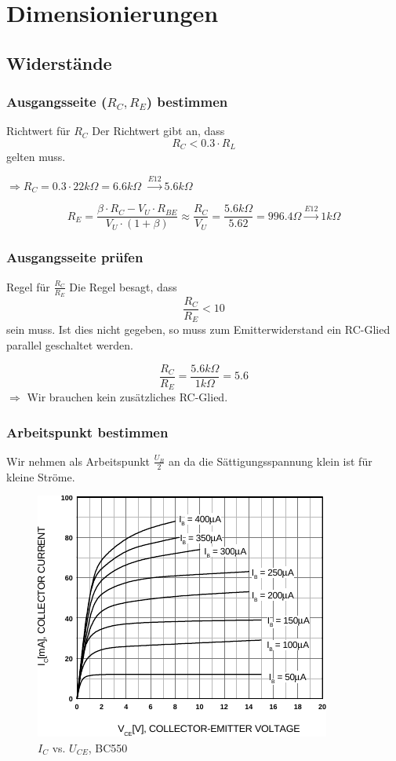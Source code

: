 \section{Dimensionierungen}

\subsection{Widerstände}

\begin{frame}
	\frametitle{Ausgangsseite ($R_C, R_E$) bestimmen}
		\begin{block}{Richtwert für $R_C$}
			Der Richtwert gibt an, dass
			\[R_C < 0.3 \cdot R_L \]
			gelten muss.
		\end{block}
			$\Rightarrow R_C = 0.3 \cdot 22k \Omega = 6.6k \Omega$
			$\xrightarrow{E12} 5.6k \Omega$

		\[ R_E = \frac{\beta \cdot R_C - V_U \cdot R_{BE}}
		{V_U \cdot (1+\beta)} \approx \frac{R_C}{V_U} =
		\frac{5.6k \Omega}{5.62} = 
		996.4 \Omega \xrightarrow{E12} 1k \Omega \]
\end{frame}

\begin{frame}
	\frametitle{Ausgangsseite prüfen}
		\begin{block}{Regel für $\frac{R_C}{R_E}$}
			Die Regel besagt, dass 
			\[ \frac{R_C}{R_E} < 10 \]
			sein muss. Ist dies nicht gegeben, so muss zum
			Emitterwiderstand ein RC-Glied parallel geschaltet
			werden.	
		\end{block}
		\[ \frac{R_C}{R_E} = \frac{5.6k \Omega}{1k \Omega} = 5.6 \]
		$\Rightarrow$ Wir brauchen kein zusätzliches RC-Glied.
				
\end{frame}

\begin{frame}
	\frametitle{Arbeitspunkt bestimmen}
		Wir nehmen als Arbeitspunkt $\frac{U_B}{2}$ an da die
		Sättigungsspannung klein ist für kleine Ströme.
		\begin{figure}
			\centering
				\includegraphics{BC550_Ic_Uce.pdf}
			\caption{$I_C$ vs. $U_{CE}$, BC550}
		\end{figure}
\end{frame}

